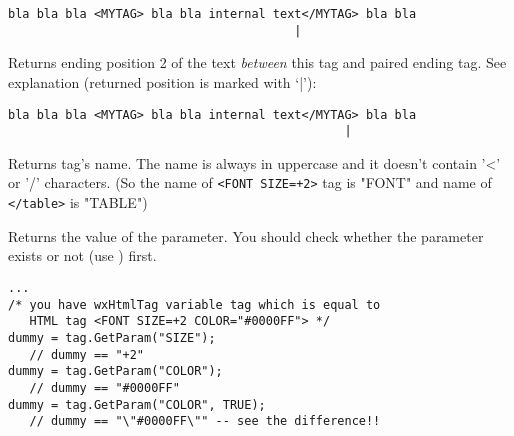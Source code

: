 \begin{verbatim}
bla bla bla <MYTAG> bla bla internal text</MYTAG> bla bla
                                        |
\end{verbatim}


\label{wxhtmltaggetendpos2}


Returns ending position 2 of the text {\it between} this tag and paired
ending tag.
See explanation (returned position is marked with `|'):

\begin{verbatim}
bla bla bla <MYTAG> bla bla internal text</MYTAG> bla bla
                                               |
\end{verbatim}

\label{wxhtmltaggetname}


Returns tag's name. The name is always in uppercase and it doesn't contain
'<' or '/' characters. (So the name of {\tt <FONT SIZE=+2>} tag is "FONT"
and name of {\tt </table>} is "TABLE")


\label{wxhtmltaggetparam}


Returns the value of the parameter. You should check whether the
parameter exists or not (use ) first.





\begin{verbatim}
...
/* you have wxHtmlTag variable tag which is equal to
   HTML tag <FONT SIZE=+2 COLOR="#0000FF"> */
dummy = tag.GetParam("SIZE");
   // dummy == "+2"
dummy = tag.GetParam("COLOR");
   // dummy == "#0000FF"
dummy = tag.GetParam("COLOR", TRUE);
   // dummy == "\"#0000FF\"" -- see the difference!!
\end{verbatim}

\label{wxhtmltaggetparamascolour}

